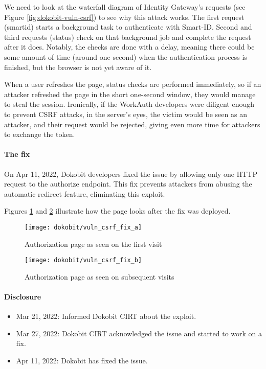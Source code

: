 We need to look at the waterfall diagram of Identity Gateway's requests (see Figure \ref{fig:dokobit-vuln-csrf}) to see why this attack works. The first request ({smartid}) starts a background task to authenticate with Smart-ID. Second and third requests ({status}) check on that background job and complete the request after it does. Notably, the checks are done with a delay, meaning there could be some amount of time (around one second) when the authentication process is finished, but the browser is not yet aware of it.

When a user refreshes the page, status checks are performed immediately, so if an attacker refreshed the page in the short one-second window, they would manage to steal the session. Ironically, if the WorkAuth developers were diligent enough to prevent CSRF attacks, in the server's eyes, the victim would be seen as an attacker, and their request would be rejected, giving even more time for attackers to exchange the token.

\paragraph{The fix}

On Apr 11, 2022, Dokobit developers fixed the issue by allowing only one HTTP request to the {authorize} endpoint. This fix prevents attackers from abusing the automatic redirect feature, eliminating this exploit. 

Figures \ref{fig:dokobit-vuln-csrf-fix-a} and \ref{fig:dokobit-vuln-csrf-fix-b} illustrate how the page looks after the fix was deployed.

\begin{figure}
  \centering
  \texttt{[image: dokobit/vuln\_csrf\_fix\_a]}
  \caption{Authorization page as seen on the first visit}
  \label{fig:dokobit-vuln-csrf-fix-a}
\end{figure}

\begin{figure}
  \centering
  \texttt{[image: dokobit/vuln\_csrf\_fix\_b]}
  \caption{Authorization page as seen on subsequent visits}
  \label{fig:dokobit-vuln-csrf-fix-b}
\end{figure}

\paragraph{Disclosure}

\begin{itemize}
  \item Mar 21, 2022: Informed Dokobit CIRT about the exploit.
  \item Mar 27, 2022: Dokobit CIRT acknowledged the issue and started to work on a fix.
  \item Apr 11, 2022: Dokobit has fixed the issue.
\end{itemize}